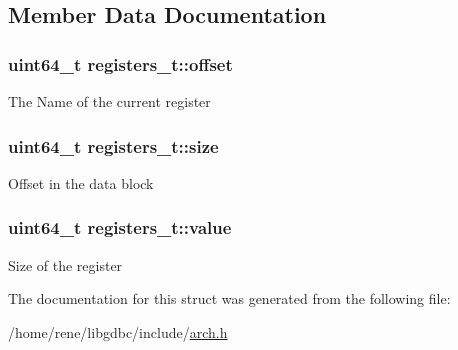 \subsection{Member Data Documentation}
\hypertarget{structregisters__t_a191e9e10bdb03f486392e89c6779f6b2}{
\subsubsection[{offset}]{\setlength{\rightskip}{0pt plus 5cm}uint64\-\_\-t registers\-\_\-t\-::offset}}\label{structregisters__t_a191e9e10bdb03f486392e89c6779f6b2}
The Name of the current register \hypertarget{structregisters__t_acb764ed24b115568e56a1144d5eb0a1d}{
\subsubsection[{size}]{\setlength{\rightskip}{0pt plus 5cm}uint64\-\_\-t registers\-\_\-t\-::size}}\label{structregisters__t_acb764ed24b115568e56a1144d5eb0a1d}
Offset in the data block \hypertarget{structregisters__t_a2fd077f839ddcab48b721f9fce79cf91}{
\subsubsection[{value}]{\setlength{\rightskip}{0pt plus 5cm}uint64\-\_\-t registers\-\_\-t\-::value}}\label{structregisters__t_a2fd077f839ddcab48b721f9fce79cf91}
Size of the register 

The documentation for this struct was generated from the following file\-:\begin{DoxyCompactItemize}
\item 
/home/rene/libgdbc/include/\hyperlink{arch_8h}{arch.\-h}\end{DoxyCompactItemize}
